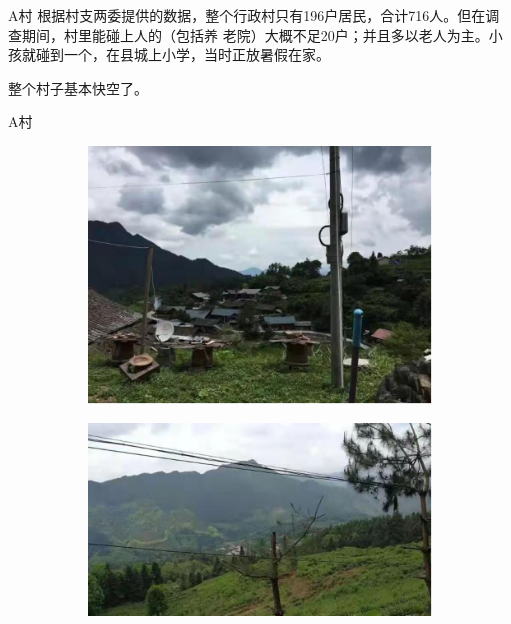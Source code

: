\documentclass[presentation]{beamer}
\begin{document}
\begin{frame}[label={sec:orgf2d6dd6}]{A村}
根据村支两委提供的数据，整个行政村只有196户居民，合计716人。但在调查期间，村里能碰上人的（包括养
老院）大概不足20户；并且多以老人为主。小孩就碰到一个，在县城上小学，当时正放暑假在家。\pause

整个村子基本快空了。
\end{frame}
\begin{frame}[label={sec:org4e1b925}]{A村}
\begin{figure}
    \centering
    \begin{subfigure}[b]{0.48\textwidth}
        \centering
        \includegraphics[width=\textwidth]{11}
    \end{subfigure}
    \hfill
    \begin{subfigure}[b]{0.48\textwidth}
        \centering
        \includegraphics[width=\textwidth]{12}
    \end{subfigure}

\end{figure}
\end{frame}
\end{document}
